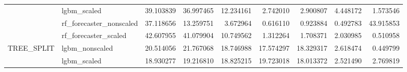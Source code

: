 \begin{table}
\begin{tabular}{llrrrrrrr}
 & lgbm\_scaled & {\cellcolor[HTML]{B40426}} \color[HTML]{F1F1F1} 39.103839 & {\cellcolor[HTML]{C83836}} \color[HTML]{F1F1F1} 36.997465 & {\cellcolor[HTML]{98B9FF}} \color[HTML]{000000} 12.234161 & {\cellcolor[HTML]{4358CB}} \color[HTML]{F1F1F1} 2.742010 & {\cellcolor[HTML]{455CCE}} \color[HTML]{F1F1F1} 2.900807 & {\cellcolor[HTML]{516DDB}} \color[HTML]{F1F1F1} 4.448172 & {\cellcolor[HTML]{3B4CC0}} \color[HTML]{F1F1F1} 1.573546 \\
 & rf\_forecaster\_nonscaled & {\cellcolor[HTML]{E57058}} \color[HTML]{F1F1F1} 37.118656 & {\cellcolor[HTML]{9DBDFF}} \color[HTML]{000000} 13.259751 & {\cellcolor[HTML]{506BDA}} \color[HTML]{F1F1F1} 3.672964 & {\cellcolor[HTML]{3B4CC0}} \color[HTML]{F1F1F1} 0.616110 & {\cellcolor[HTML]{3D50C3}} \color[HTML]{F1F1F1} 0.923884 & {\cellcolor[HTML]{3B4CC0}} \color[HTML]{F1F1F1} 0.492783 & {\cellcolor[HTML]{B40426}} \color[HTML]{F1F1F1} 43.915853 \\
 & rf\_forecaster\_scaled & {\cellcolor[HTML]{B40426}} \color[HTML]{F1F1F1} 42.607955 & {\cellcolor[HTML]{C12B30}} \color[HTML]{F1F1F1} 41.079904 & {\cellcolor[HTML]{8BADFD}} \color[HTML]{000000} 10.749562 & {\cellcolor[HTML]{3F53C6}} \color[HTML]{F1F1F1} 1.312264 & {\cellcolor[HTML]{4358CB}} \color[HTML]{F1F1F1} 1.708371 & {\cellcolor[HTML]{455CCE}} \color[HTML]{F1F1F1} 2.030985 & {\cellcolor[HTML]{3B4CC0}} \color[HTML]{F1F1F1} 0.510958 \\
\cline{1-9}
\multirow[c]{2}{*}{TREE\_SPLIT} & lgbm\_nonscaled & {\cellcolor[HTML]{CA3B37}} \color[HTML]{F1F1F1} 20.514056 & {\cellcolor[HTML]{B40426}} \color[HTML]{F1F1F1} 21.767068 & {\cellcolor[HTML]{E26952}} \color[HTML]{F1F1F1} 18.746988 & {\cellcolor[HTML]{ED8366}} \color[HTML]{F1F1F1} 17.574297 & {\cellcolor[HTML]{E67259}} \color[HTML]{F1F1F1} 18.329317 & {\cellcolor[HTML]{5A78E4}} \color[HTML]{F1F1F1} 2.618474 & {\cellcolor[HTML]{3B4CC0}} \color[HTML]{F1F1F1} 0.449799 \\
 & lgbm\_scaled & {\cellcolor[HTML]{C43032}} \color[HTML]{F1F1F1} 18.930277 & {\cellcolor[HTML]{BE242E}} \color[HTML]{F1F1F1} 19.216810 & {\cellcolor[HTML]{C73635}} \color[HTML]{F1F1F1} 18.825215 & {\cellcolor[HTML]{B40426}} \color[HTML]{F1F1F1} 19.723018 & {\cellcolor[HTML]{D65244}} \color[HTML]{F1F1F1} 18.013372 & {\cellcolor[HTML]{3B4CC0}} \color[HTML]{F1F1F1} 2.521490 & {\cellcolor[HTML]{3E51C5}} \color[HTML]{F1F1F1} 2.769819 \\
\cline{1-9}
\bottomrule
\end{tabular}
\end{table}
